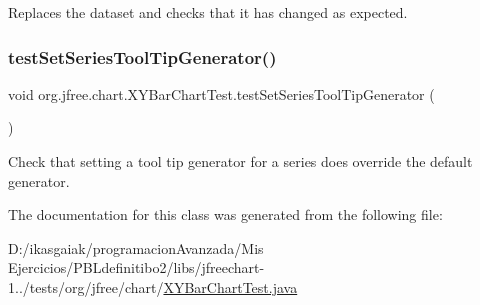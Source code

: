 Replaces the dataset and checks that it has changed as expected. \mbox{\label{classorg_1_1jfree_1_1chart_1_1_x_y_bar_chart_test_a7eeca0cae9d0b486cc918484560000a1}} 
\subsubsection{\texorpdfstring{test\+Set\+Series\+Tool\+Tip\+Generator()}{testSetSeriesToolTipGenerator()}}
{\footnotesize\ttfamily void org.\+jfree.\+chart.\+X\+Y\+Bar\+Chart\+Test.\+test\+Set\+Series\+Tool\+Tip\+Generator (\begin{DoxyParamCaption}{ }\end{DoxyParamCaption})}

Check that setting a tool tip generator for a series does override the default generator. 

The documentation for this class was generated from the following file\+:\begin{DoxyCompactItemize}
\item 
D\+:/ikasgaiak/programacion\+Avanzada/\+Mis Ejercicios/\+P\+B\+Ldefinitibo2/libs/jfreechart-\/1../tests/org/jfree/chart/\mbox{\hyperlink{_x_y_bar_chart_test_8java}{X\+Y\+Bar\+Chart\+Test.\+java}}\end{DoxyCompactItemize}
